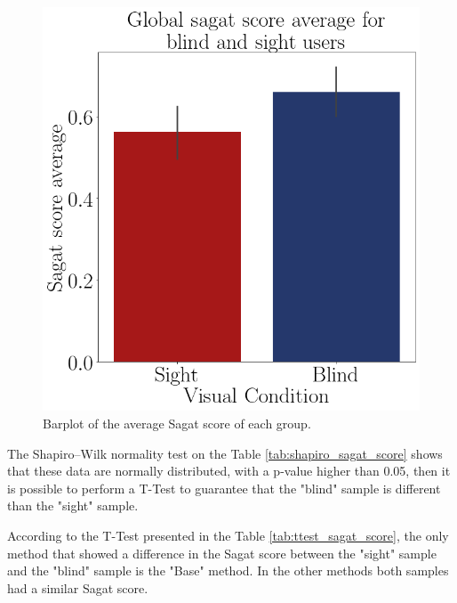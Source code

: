 \begin{figure}[!htb]
\begin{minipage}{.45\linewidth}
        \vspace{1.8cm}
        \centering
        \includegraphics[width = \linewidth]{Resultados/Sagat/Figuras/png/barplot_sagat_avg_global.png}
        \caption{Barplot of the average Sagat score of each group.}
        \label{fig:barplot_sagat}
    \end{minipage}
\end{figure}


The Shapiro–Wilk normality test on the Table \ref{tab:shapiro_sagat_score} shows that these data are normally distributed, with a p-value higher than 0.05, then it is possible to perform a T-Test to guarantee that the "blind" sample is different than the "sight" sample.

%

According to the T-Test presented in the Table \ref{tab:ttest_sagat_score}, the only method that showed a difference in the Sagat score between the "sight" sample and the "blind" sample is the "Base" method. In the other methods both samples had a similar Sagat score.

